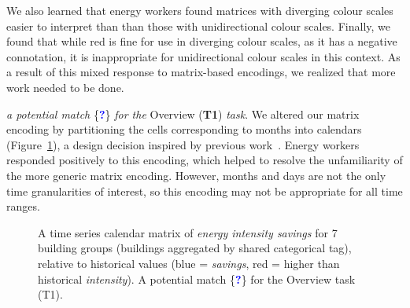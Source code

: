 \documentclass[journal]{vgtc}                %
\newcommand*\posmatch{\textcolor{blue}{{\bf ?}}}
\newcommand{\bstart}[1]{\vspace{1mm} \noindent{\textbf{#1:}}}
\begin{document}
We also learned that energy workers found matrices with diverging colour scales easier to interpret than than those with unidirectional colour scales. 
Finally, we found that while red is fine for use in diverging colour scales, as it has a negative connotation, it is inappropriate for unidirectional colour scales in this context. 
As a result of this mixed response to matrix-based encodings, we realized that more work needed to be done.

\bstart{Calendar matrix} {\it a potential match} \{\posmatch\} {\it for the} Overview ({\bf T1}) {\it task}.
We altered our matrix encoding by partitioning the cells corresponding to months into calendars (Figure~\ref{fig:sandbox-calendar}), a design decision inspired by previous work~\cite{Lammarsch2009,vanWijk1999}. 
Energy workers responded positively to this encoding, which helped to resolve the unfamiliarity of the more generic matrix encoding. 
However, months and days are not the only time granularities of interest, so this encoding may not be appropriate for all time ranges.

\begin{figure}[ht]
	\centering
	\vspace{-0.15cm}
	\caption{A time series calendar matrix of \textsl{energy intensity savings} for 7 building groups (buildings aggregated by shared categorical tag), relative to historical values (blue = \textsl{savings}, red = higher than historical \textsl{intensity}). A potential match \{\posmatch\} for the Overview task (T1).}
	\label{fig:sandbox-calendar}
	\vspace{-0.6cm}
\end{figure}
\end{document}
